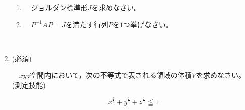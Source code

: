 \documentclass[dvipdfmx, 11pt]{jsarticle}
\renewcommand{\(}[0]{\left(}
\renewcommand{\)}[0]{\right)}
\renewcommand{\[}[0]{\left[}
\renewcommand{\]}[0]{\right]}
\begin{document}
\begin{enumerate}
	\begin{enumerate}
		\item
		　ジョルダン標準形$J$を求めなさい。\\
		
		\item
		　$P^{-1} A P = J$を満たす行列$P$を$1$つ挙げなさい。
	\end{enumerate}

	\ \\[138pt]
	

	\item \quad (必須)
	
	　$xyz$空間内において，次の不等式で表される領域の体積$V$を求めなさい。
	\hspace{\fill} (測定技能)
	
	\begin{equation*}
		x^{\frac{2}{3}} + y^{\frac{2}{3}} + z^{\frac{2}{3}} \leqq 1
	\end{equation*}

\end{enumerate}

\newpage
\end{document}
